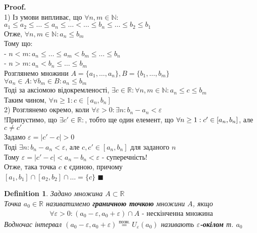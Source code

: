 \documentclass[a4paper, 14pt]{extarticle}
\def\bigline{\vspace{5mm}\\}
\theoremstyle{theoremdd}
\theoremstyle{theoremdd}
\newtheorem{definition}[theorem]{Definition}
\theoremstyle{theoremdd}
\theoremstyle{theoremdd}
\theoremstyle{theoremdd}
\theoremstyle{theoremdd}
\theoremstyle{theoremdd}
\theoremstyle{theoremdd}
\newenvironment{pf}{\vspace*{-3mm} \textbf{Proof. \\}}{$\blacksquare$}
\begin{document}
	\begin{pf}
	1) Із умови випливає, що $\forall n,m \in \mathbb{N}:$\\
	$a_1 \leq a_2 \leq \dots \leq a_n \leq \dots < \dots \leq b_n \leq \dots \leq b_2 \leq b_1$\\
	Отже, $\forall n,m \in \mathbb{N}: a_n \leq b_m$\\
	Тому що:\\
	- $n < m: a_n \leq \dots \leq a_m < b_m \leq \dots \leq b_n$\\
	- $n > m: a_n < b_n \leq \dots \leq b_m$\\
	Розглянемо множини $A = \{a_1,\dots,a_n\}, B = \{b_1, \dots, b_m\}$\\
	$\forall a_n \in A: \forall b_m \in B: a_n \leq b_m$\\
	Тоді за аксіомою відокремленості, $\exists c \in \mathbb{R}: \forall n,m \in \mathbb{N}: a_n \leq c \leq b_m$\\
	Таким чином, $\forall n \geq 1: c \in [a_n,b_n]$
	\bigline
	2) Розглянемо окремо, коли $\forall \varepsilon > 0: \exists n: b_n - a_n < \varepsilon$\\
	!Припустимо, що $\exists c' \in \mathbb{R}:$, тобто ще один елемент, що $\forall n \geq 1: \\ c' \in [a_n,b_n]$, але $c \neq c'$\\
	Задамо $\varepsilon = |c' - c| > 0$\\
	Тоді $\exists n: b_n - a_n < \varepsilon$, але $c,c' \in [a_n,b_n]$ для заданого $n$\\
	Тому $\varepsilon = |c'-c| < a_n-b_n < \varepsilon$ - суперечність!\\
	Отже, така точка $c$ є єдиною, причому\\
	$[a_1, b_1] \cap [a_2, b_2] \cap \dots = \{c\}$
	\end{pf}
	
	\begin{definition}
	Задано множина $A \subset \mathbb{R}$\\
	Точка $a_0 \in \mathbb{R}$ називатимемо \textbf{граничною точкою} множини $A$, якщо
	\begin{align*}
	\forall \varepsilon > 0: (a_0 - \varepsilon, a_0 + \varepsilon) \cap A \textrm{ - нескінченна множина}
	\end{align*}
	Водночас інтервал $(a_0 - \varepsilon, a_0 + \varepsilon) \overset{\textrm{позн.}}{=} U_{\varepsilon}(a_0)$ називають \textbf{$\varepsilon$-окілом} т. $a_0$
	\end{definition}
	
\end{document}

